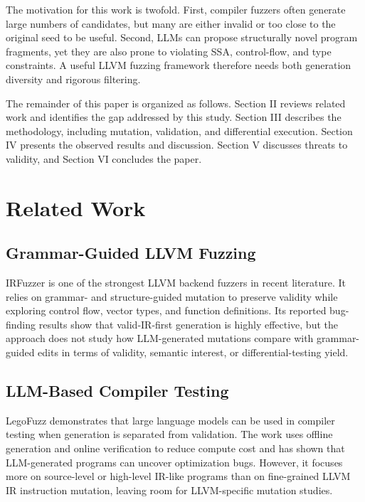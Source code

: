 \documentclass[journal]{IEEEtran}
\begin{document}
The motivation for this work is twofold. First, compiler fuzzers often generate large numbers of candidates, but many are either invalid or too close to the original seed to be useful. Second, LLMs can propose structurally novel program fragments, yet they are also prone to violating SSA, control-flow, and type constraints. A useful LLVM fuzzing framework therefore needs both generation diversity and rigorous filtering.

The remainder of this paper is organized as follows. Section II reviews related work and identifies the gap addressed by this study. Section III describes the methodology, including mutation, validation, and differential execution. Section IV presents the observed results and discussion. Section V discusses threats to validity, and Section VI concludes the paper.

\section{Related Work}

\subsection{Grammar-Guided LLVM Fuzzing}

IRFuzzer \cite{irfuzzer} is one of the strongest LLVM backend fuzzers in recent literature. It relies on grammar- and structure-guided mutation to preserve validity while exploring control flow, vector types, and function definitions. Its reported bug-finding results show that valid-IR-first generation is highly effective, but the approach does not study how LLM-generated mutations compare with grammar-guided edits in terms of validity, semantic interest, or differential-testing yield.

\subsection{LLM-Based Compiler Testing}

LegoFuzz \cite{legofuzz} demonstrates that large language models can be used in compiler testing when generation is separated from validation. The work uses offline generation and online verification to reduce compute cost and has shown that LLM-generated programs can uncover optimization bugs. However, it focuses more on source-level or high-level IR-like programs than on fine-grained LLVM IR instruction mutation, leaving room for LLVM-specific mutation studies.
\end{document}
